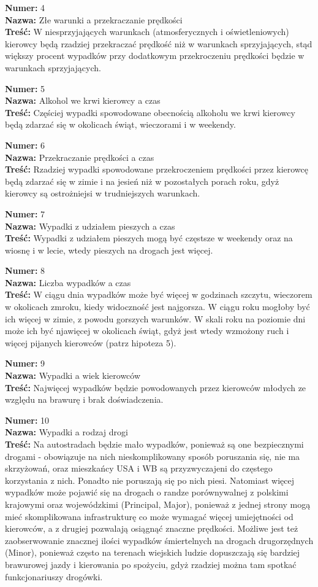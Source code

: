 \textbf{Numer:} 4\\\textbf{Nazwa:} Złe warunki a przekraczanie
prędkości\\\textbf{Treść:} W niesprzyjających warunkach (atmosferycznych
i oświetleniowych) kierowcy będą rzadziej przekraczać prędkość niż w
warunkach sprzyjających, stąd większy procent wypadków przy dodatkowym
przekroczeniu prędkości będzie w warunkach sprzyjających.

\textbf{Numer:} 5\\\textbf{Nazwa:} Alkohol we krwi kierowcy a
czas\\\textbf{Treść:} Częściej wypadki spowodowane obecnością alkoholu
we krwi kierowcy będą zdarzać się w okolicach świąt, wieczorami i w
weekendy.

\textbf{Numer:} 6\\\textbf{Nazwa:} Przekraczanie prędkości a
czas\\\textbf{Treść:} Rzadziej wypadki spowodowane przekroczeniem
prędkości przez kierowcę będą zdarzać się w zimie i na jesień niż w
pozostałych porach roku, gdyż kierowcy są ostrożniejsi w trudniejszych
warunkach.

\textbf{Numer:} 7\\\textbf{Nazwa:} Wypadki z udziałem pieszych a
czas\\\textbf{Treść:} Wypadki z udziałem pieszych mogą być częstsze w
weekendy oraz na wiosnę i w lecie, wtedy pieszych na drogach jest
więcej.

\textbf{Numer:} 8\\\textbf{Nazwa:} Liczba wypadków a
czas\\\textbf{Treść:} W ciągu dnia wypadków może być więcej w godzinach
szczytu, wieczorem w okolicach zmroku, kiedy widoczność jest najgorsza.
W ciągu roku mogłoby być ich więcej w zimie, z powodu gorszych warunków.
W skali roku na poziomie dni może ich być njawięcej w okolicach świąt,
gdyż jest wtedy wzmożony ruch i więcej pijanych kierowców (patrz
hipoteza 5).

\textbf{Numer:} 9\\\textbf{Nazwa:} Wypadki a wiek
kierowców\\\textbf{Treść:} Najwięcej wypadków będzie powodowanych przez
kierowców młodych ze względu na brawurę i brak doświadczenia.

\textbf{Numer:} 10\\\textbf{Nazwa:} Wypadki a rodzaj
drogi\\\textbf{Treść:} Na autostradach będzie mało wypadków, ponieważ są
one bezpiecznymi drogami - obowiązuje na nich nieskomplikowany sposób
poruszania się, nie ma skrzyżowań, oraz mieszkańcy USA i WB są
przyzwyczajeni do częstego korzystania z nich. Ponadto nie poruszają się
po nich piesi. Natomiast więcej wypadków może pojawić się na drogach o
randze porównywalnej z polskimi krajowymi oraz wojewódzkimi (Principal,
Major), ponieważ z jednej strony mogą mieć skomplikowana infrastrukturę
co może wymagać więcej umiejętności od kierowców, a z drugiej pozwalają
osiągnąć znaczne prędkości. Możliwe jest też zaobserwowanie znacznej
ilości wypadków śmiertelnych na drogach drugorzędnych (Minor), ponieważ
często na terenach wiejskich ludzie dopuszczają się bardziej brawurowej
jazdy i kierowania po spożyciu, gdyż rzadziej można tam spotkać
funkcjonariuszy drogówki.
